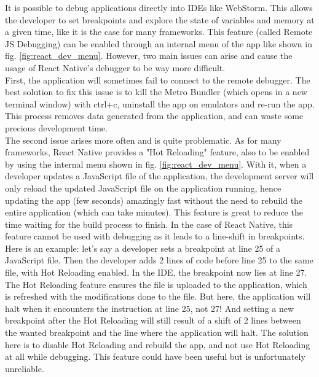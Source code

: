 \documentclass[11pt, a4paper, twoside, openright]{article} %
\begin{document}
{It is possible to debug applications directly into IDEs like WebStorm. This allows the developer to set breakpoints and explore the state of variables and memory at a given time, like it is the case for many frameworks. This feature (called Remote JS Debugging) can be enabled through an internal menu of the app like shown in fig. \ref{fig:react_dev_menu}.
However, two main issues can arise and cause the usage of React Native's debugger to be way more difficult.\\

First, the application will sometimes fail to connect to the remote debugger. The best solution to fix this issue is to kill the Metro Bundler (which opens in a new terminal window) with ctrl+c, uninstall the app on emulators and re-run the app. This process removes data generated from the application, and can waste some precious development time.\\

The second issue arises more often and is quite problematic. As for many frameworks, React Native provides a "Hot Reloading" feature, also to be enabled by using the internal menu shown in fig. \ref{fig:react_dev_menu}. With it, when a developer updates a JavaScript file of the application, the development server will only reload the updated JavaScript file on the application running, hence updating the app (few seconds) amazingly fast without the need to rebuild the entire application (which can take minutes). This feature is great to reduce the time waiting for the build process to finish. 
In the case of React Native, this feature cannot be used with debugging as it leads to a line-shift in breakpoints. \\
Here is an example: let's say a developer sets a breakpoint at line 25 of a JavaScript file. Then the developer adds 2 lines of code before line 25 to the same file, with Hot Reloading enabled. In the IDE, the breakpoint now lies at line 27. The Hot Reloading feature ensures the file is uploaded to the application, which is refreshed with the modifications done to the file. But here, the application will halt when it encounters the instruction at line 25, not 27! And setting a new breakpoint after the Hot Reloading will still result of a shift of 2 lines between the wanted breakpoint and the line where the application will halt. The solution here is to disable Hot Reloading and rebuild the app, and not use Hot Reloading at all while debugging. This feature could have been useful but is unfortunately unreliable.

}
\end{document}

